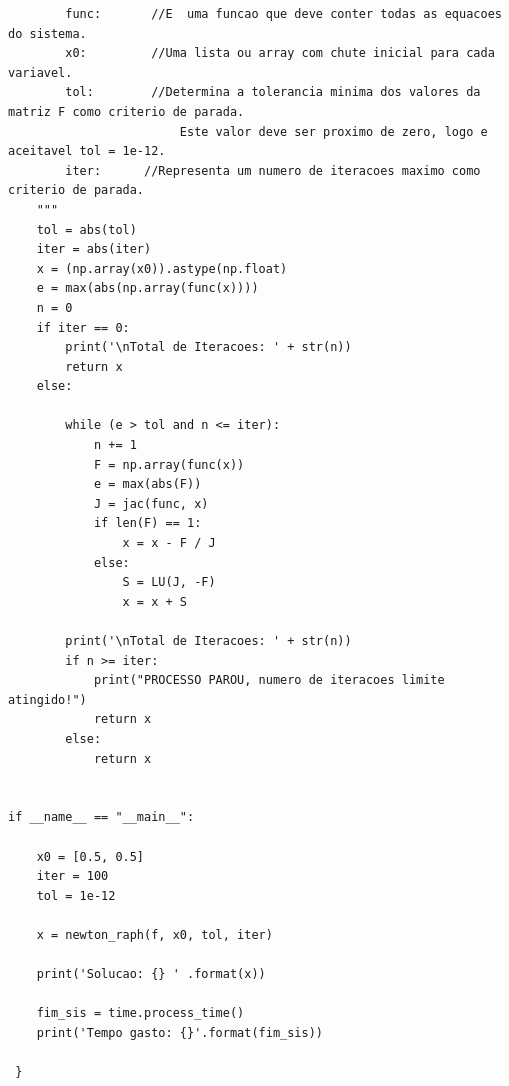 \documentclass[a4paper, 12pt, openright, oneside]{article}
\begin{document}
\begin{lstlisting}
	    func:       //E  uma funcao que deve conter todas as equacoes do sistema.
	    x0:         //Uma lista ou array com chute inicial para cada variavel.
	    tol:        //Determina a tolerancia minima dos valores da matriz F como criterio de parada.
	                    Este valor deve ser proximo de zero, logo e aceitavel tol = 1e-12.
	    iter:      //Representa um numero de iteracoes maximo como criterio de parada.
    """
    tol = abs(tol)
    iter = abs(iter)
    x = (np.array(x0)).astype(np.float)
    e = max(abs(np.array(func(x))))
    n = 0
    if iter == 0:
        print('\nTotal de Iteracoes: ' + str(n))
        return x
    else:

        while (e > tol and n <= iter):
            n += 1
            F = np.array(func(x))
            e = max(abs(F))
            J = jac(func, x)
            if len(F) == 1:
                x = x - F / J
            else:
                S = LU(J, -F)
                x = x + S

        print('\nTotal de Iteracoes: ' + str(n))
        if n >= iter:
            print("PROCESSO PAROU, numero de iteracoes limite atingido!")
            return x
        else:
            return x


if __name__ == "__main__":

    x0 = [0.5, 0.5]
    iter = 100
    tol = 1e-12

    x = newton_raph(f, x0, tol, iter)

    print('Solucao: {} ' .format(x))

    fim_sis = time.process_time()
    print('Tempo gasto: {}'.format(fim_sis))

 } \end{lstlisting}
\end{document}

